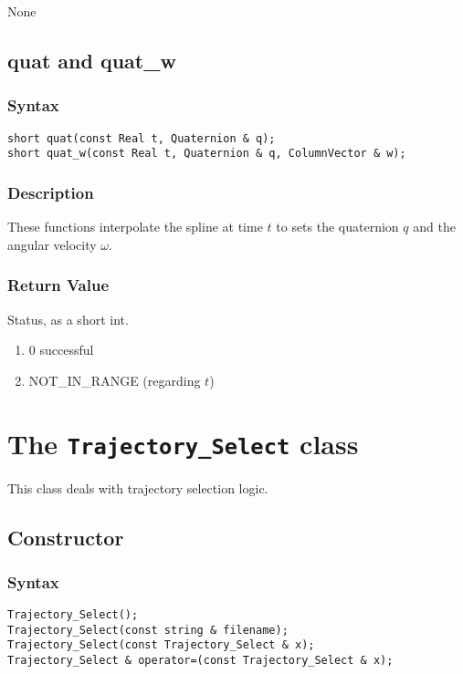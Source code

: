 \documentclass[dvips,11pt,fleqn]{report}
\begin{document}
None

\newpage

\subsection*{quat and quat\_w}
\subsubsection*{Syntax}
\begin{verbatim}
short quat(const Real t, Quaternion & q);
short quat_w(const Real t, Quaternion & q, ColumnVector & w);
\end{verbatim}

\subsubsection*{Description}   
These functions interpolate the spline at time $t$ to sets the
quaternion $q$ and the angular velocity $\omega$.

\subsubsection*{Return Value}

Status, as a short int.
\begin{enumerate}
\item[] 0 successful
\item[] NOT\_IN\_RANGE (regarding $t$)
\end{enumerate}

\newpage

\section{The \texttt{Trajectory\_Select} class}

This class deals with trajectory selection logic.

\subsection*{Constructor}
\subsubsection*{Syntax}
\begin{verbatim}
Trajectory_Select();
Trajectory_Select(const string & filename);
Trajectory_Select(const Trajectory_Select & x);
Trajectory_Select & operator=(const Trajectory_Select & x);
\end{verbatim}
\end{document}
